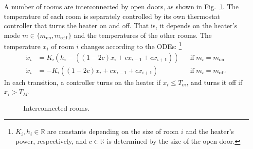 A number of rooms are interconnected by open doors, 
as shown in Fig.~\ref{fig:adj-rooms}.
The temperature of each room is separately controlled by its own
thermostat controller that turns the heater on and off.
That is, it %
depends on
the heater's mode $m \in \{m_\texttt{on}, m_\texttt{off}\}$  and the temperatures of the other rooms.
The temperature $x_i$ of room $i$
changes according to the ODEs:%
\footnote{%
$K_i, h_i \in \mathbb{R}$ are constants depending on
the size of room $i$ and the heater's power, respectively,
and $c \in \mathbb{R}$ is determined by the size of the open door.}
\begin{align*}
\dot{x}_i &= K_i (h_i - ((1- 2 c) x_i + c x_{i-1} + c x_{i+1})) &&\mbox{if}\; m_i = m_\texttt{on}
\\
\dot{x}_i &= - K_i ((1- 2 c) x_i + c x_{i-1} + c x_{i+1}) && \mbox{if}\; m_i = m_\texttt{off}
\end{align*}
%
In each transition, a controller turns on the heater 
 if $x_i \leq T_m$,
and turns it  off if $x_i > T_M$.

\begin{figure}
\centering
{}
\caption{Interconnected rooms. %
} \label{fig:adj-rooms}
\end{figure}

